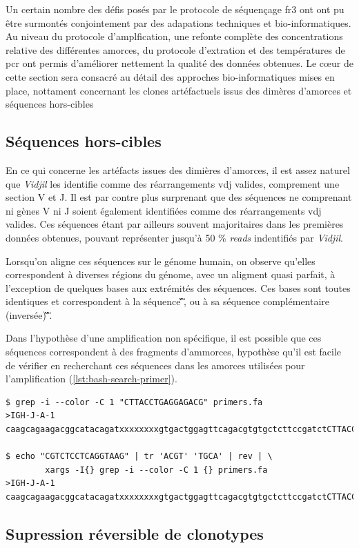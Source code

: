 Un certain nombre des défis posés par le protocole de séquençage \gls{fr}3 ont ont pu être surmontés conjointement par 
des adapations techniques et bio-informatiques. Au niveau du protocole d'amplfication, une refonte complète des concentrations 
relative des différentes amorces, du protocole d'extration et des températures de \gls{pcr} ont permis d'améliorer nettement 
la qualité des données obtenues. Le cœur de cette section sera consacré au détail des approches bio-informatiques mises en place, 
nottament concernant les clones artéfactuels issus des dimères d'amorces et séquences hors-cibles 

\subsection{Séquences hors-cibles}

En ce qui concerne les artéfacts issues des dimières d'amorces, il est assez naturel que \textit{Vidjil} les identifie comme 
des réarrangements \gls{vdj} valides, comprement une section V et J. Il est par contre plus surprenant que des séquences ne comprenant 
ni gènes V ni J soient également identifiées comme des réarrangements \gls{vdj} valides. Ces séquences étant par ailleurs souvent majoritaires 
dans les premières données obtenues, pouvant représenter jusqu'à 50 \% \textit{reads} indentifiés par \textit{Vidjil}.

Lorsqu'on aligne ces séquences sur le génome humain, on observe qu'elles correspondent à diverses régions du génome, avec un aligment quasi 
parfait, à l'exception de quelques bases aux extrémités des séquences. Ces bases sont toutes identiques et correspondent à la séquence 
\C\G\T\C\T\C\C\T\C\A\G\G\T\A\A\G, ou à sa séquence complémentaire (inversée) \C\T\T\A\C\C\T\G\A\G\G\A\G\A\C\G.

Dans l'hypothèse d'une amplification non spécifique, il est possible que ces séquences correspondent à des fragments d'ammorces,
hypothèse qu'il est facile de vérifier en recherchant ces séquences dans les amorces utilisées pour l'amplification 
(\autoref{lst:bash-search-primer}).

\begin{lstlisting}[language=custombash, 
caption={Commande Bash et résultat de la recherche des séquences dans les amorces dégénérées},
label={lst:bash-search-primer},
basicstyle=\ttfamily\scriptsize]
$ grep -i --color -C 1 "CTTACCTGAGGAGACG" primers.fa
>IGH-J-A-1
caagcagaagacggcatacagatxxxxxxxxgtgactggagttcagacgtgtgctcttccgatctCTTACCTGAGGAGACGgtgacc

$ echo "CGTCTCCTCAGGTAAG" | tr 'ACGT' 'TGCA' | rev | \
        xargs -I{} grep -i --color -C 1 {} primers.fa
>IGH-J-A-1
caagcagaagacggcatacagatxxxxxxxxgtgactggagttcagacgtgtgctcttccgatctCTTACCTGAGGAGACGgtgacc

\end{lstlisting}

\subsection{Supression réversible de clonotypes}

